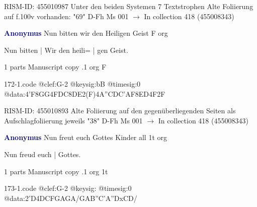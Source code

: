 \documentclass[twocolumn]{book}
\begin{document}
\newline RISM-ID: 455010987
\newline Unter den beiden Systemen 7 Textstrophen
\newline Alte Foliierung auf f.100v vorhanden: "69"
\newline D-Fh  Ms 001
\newline $\rightarrow$ In collection 418 (455008343)

\newline \par \vspace{7pt} \textcolor{darkblue}{\textbf{Anonymus  }}
\newline Nun bitten wir den Heiligen Geist  F  
\newline org
\newline \begin{itshape}[f.39r, at left:] Nun bitten | Wir den heili= | gen Geist.\end{itshape} 
\newline \textcolor{darkblue}{}  1 parts  
\newline Manuscript copy
.1  org  F  
\begin{filecontents*}{172-1.code}
@clef:G-2
@keysig:bB
@timesig:0
@data:4'F{8GG}4FDC{8DE}2(F)4A''CDC'AF{8ED}4F2F
\end{filecontents*}
\newline
%

\newline RISM-ID: 455010893
\newline Alte Foliierung auf den gegenüberliegenden Seiten als Aufschlagfoliierung jeweils "38"
\newline D-Fh  Ms 001
\newline $\rightarrow$ In collection 418 (455008343)

\newline \par \vspace{7pt} \textcolor{darkblue}{\textbf{Anonymus  }}
\newline Nun freut euch Gottes Kinder all  1t  
\newline org
\newline \begin{itshape}[f.38v, at left:] Nun freud euch | Gottes.\end{itshape} 
\newline \textcolor{darkblue}{}  1 parts  
\newline Manuscript copy
.1  org  1t  
\begin{filecontents*}{173-1.code}
@clef:G-2
@keysig:
@timesig:0
@data:2'D4DCFGAGA/GAB''C'A''DxCD/
\end{filecontents*}
\newline
%
\end{document}
